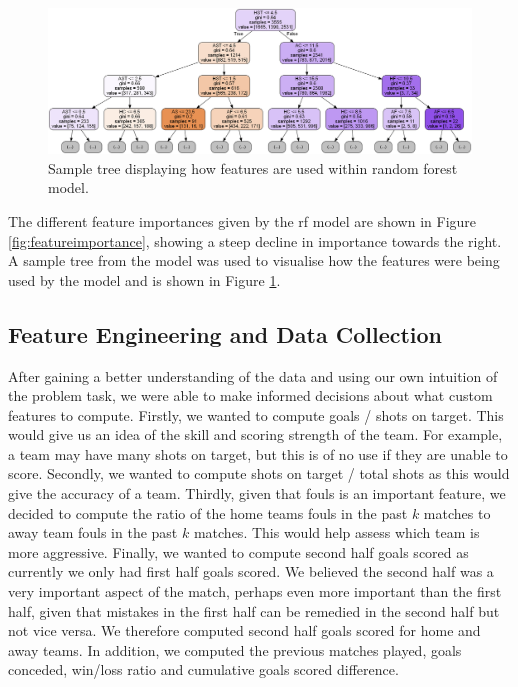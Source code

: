 \documentclass{article}
\begin{document}
\begin{figure}[!htb]
    \centering
    \includegraphics[width=\linewidth]{Images/Figure 3.png}
    \caption{Sample tree displaying how features are used within random forest model.}
    \label{fig:sampletree}
\end{figure}

The different feature importances given by the \gls{rf} model are shown in Figure \ref{fig:featureimportance}, showing a steep decline in importance towards the right. A sample tree from the model was used to visualise how the features were being used by the model and is shown in Figure \ref{fig:sampletree}. 

\subsection{Feature Engineering and Data Collection}
\label{featureengineering}

After gaining a better understanding of the data and using our own intuition of the problem task, we were able to make informed decisions about what custom features to compute. Firstly, we wanted to compute goals / shots on target. This would give us an idea of the skill and scoring strength of the team. For example, a team may have many shots on target, but this is of no use if they are unable to score. Secondly, we wanted to compute shots on target / total shots as this would give the accuracy of a team. Thirdly, given that fouls is an important feature, we decided to compute the ratio of the home teams fouls in the past $k$ matches to away team fouls in the past $k$ matches. This would help assess which team is more aggressive. Finally, we wanted to compute second half goals scored as currently we only had first half goals scored. We believed the second half was a very important aspect of the match, perhaps even more important than the first half, given that mistakes in the first half can be remedied in the second half but not vice versa. We therefore computed second half goals scored for home and away teams. In addition, we computed the previous matches played, goals conceded, win/loss ratio and cumulative goals scored difference.
\end{document}
